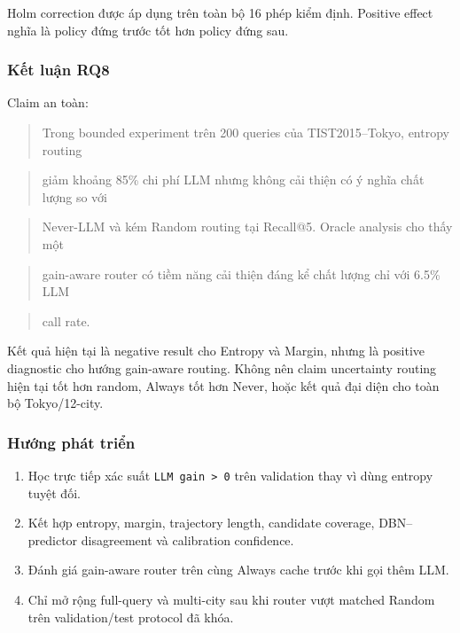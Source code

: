 Holm correction được áp dụng trên toàn bộ 16 phép kiểm định. Positive effect nghĩa là policy đứng trước tốt hơn policy đứng sau.

\subsubsection*{Kết luận RQ8}

Claim an toàn:

\begin{quote}\small Trong bounded experiment trên 200 queries của TIST2015--Tokyo, entropy routing\end{quote}
\begin{quote}\small giảm khoảng 85\% chi phí LLM nhưng không cải thiện có ý nghĩa chất lượng so với\end{quote}
\begin{quote}\small Never-LLM và kém Random routing tại Recall@5. Oracle analysis cho thấy một\end{quote}
\begin{quote}\small gain-aware router có tiềm năng cải thiện đáng kể chất lượng chỉ với 6.5\% LLM\end{quote}
\begin{quote}\small call rate.\end{quote}
Kết quả hiện tại là negative result cho Entropy và Margin, nhưng là positive diagnostic cho hướng gain-aware routing. Không nên claim uncertainty routing hiện tại tốt hơn random, Always tốt hơn Never, hoặc kết quả đại diện cho toàn bộ Tokyo/12-city.

\subsubsection*{Hướng phát triển}

\begin{enumerate}
\item Học trực tiếp xác suất \texttt{LLM gain > 0} trên validation thay vì dùng entropy
tuyệt đối.

\item Kết hợp entropy, margin, trajectory length, candidate coverage,
DBN--predictor disagreement và calibration confidence.

\item Đánh giá gain-aware router trên cùng Always cache trước khi gọi thêm LLM.
\item Chỉ mở rộng full-query và multi-city sau khi router vượt matched Random trên
validation/test protocol đã khóa.

\end{enumerate}

